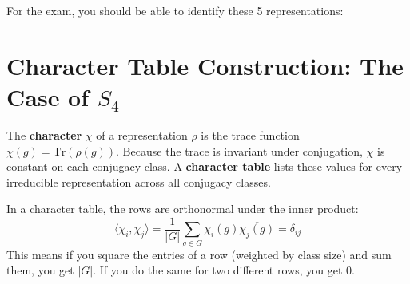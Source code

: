 \begin{example}
For the exam, you should be able to identify these 5 representations:
\end{example}

\section{Character Table Construction: The Case of $S_4$}

\begin{definition}
The \textbf{character} $\chi$ of a representation $\rho$ is the trace function $\chi(g) = (\rho(g))$. Because the trace is invariant under conjugation, $\chi$ is constant on each conjugacy class. A \textbf{character table} lists these values for every irreducible representation across all conjugacy classes.
\end{definition}

\begin{theorem}
In a character table, the rows are orthonormal under the inner product:
\[ \langle \chi_i, \chi_j \rangle = \frac{1}{|G|} \sum_{g \in G} \chi_i(g) \overline{\chi_j(g)} = \delta_{ij} \]
This means if you square the entries of a row (weighted by class size) and sum them, you get $|G|$. If you do the same for two different rows, you get 0.
\end{theorem}

